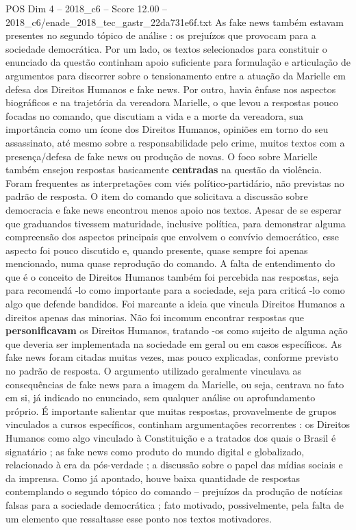 \begin{textsample}{POS Dim 4 – 2018\_c6 – Score 12.00 – 2018\_c6/enade\_2018\_tec\_gastr\_22da731e6f.txt}
As fake news também estavam presentes no segundo tópico de análise : os prejuízos que provocam para a sociedade democrática.
Por um lado, os textos selecionados para constituir o enunciado da questão continham apoio suficiente para formulação e articulação de argumentos para discorrer sobre o tensionamento entre a atuação da Marielle em defesa dos Direitos Humanos e fake news.
Por outro, havia ênfase nos aspectos biográficos e na trajetória da vereadora Marielle, o que levou a respostas pouco focadas no comando, que discutiam a vida e a morte da vereadora, sua importância como um ícone dos Direitos Humanos, opiniões em torno do seu assassinato, até mesmo sobre a responsabilidade pelo crime, muitos textos com a presença/defesa de fake news ou produção de novas.
O foco sobre Marielle também ensejou respostas basicamente \textbf{centradas} na questão da violência.
Foram frequentes as interpretações com viés político-partidário, não previstas no padrão de resposta.
O item do comando que solicitava a discussão sobre democracia e fake news encontrou menos apoio nos textos.
Apesar de se esperar que graduandos tivessem maturidade, inclusive política, para demonstrar alguma compreensão dos aspectos principais que envolvem o convívio democrático, esse aspecto foi pouco discutido e, quando presente, quase sempre foi apenas mencionado, numa quase reprodução do comando.
A falta de entendimento do que é o conceito de Direitos Humanos também foi percebida nas respostas, seja para recomendá -lo como importante para a sociedade, seja para criticá -lo como algo que defende bandidos.
Foi marcante a ideia que vincula Direitos Humanos a direitos apenas das minorias.
Não foi incomum encontrar respostas que \textbf{personificavam} os Direitos Humanos, tratando -os como sujeito de alguma ação que deveria ser implementada na sociedade em geral ou em casos específicos.
As fake news foram citadas muitas vezes, mas pouco explicadas, conforme previsto no padrão de resposta.
O argumento utilizado geralmente vinculava as consequências de fake news para a imagem da Marielle, ou seja, centrava no fato em si, já indicado no enunciado, sem qualquer análise ou aprofundamento próprio.
É importante salientar que muitas respostas, provavelmente de grupos vinculados a cursos específicos, continham argumentações recorrentes : os Direitos Humanos como algo vinculado à Constituição e a tratados dos quais o Brasil é signatário ; as fake news como produto do mundo digital e globalizado, relacionado à era da pós-verdade ; a discussão sobre o papel das mídias sociais e da imprensa.
Como já apontado, houve baixa quantidade de respostas contemplando o segundo tópico do comando – prejuízos da produção de notícias falsas para a sociedade democrática ; fato motivado, possivelmente, pela falta de um elemento que ressaltasse esse ponto nos textos motivadores.

\end{textsample}
